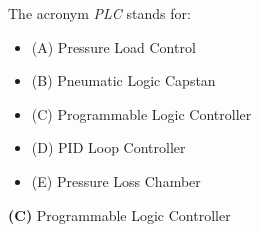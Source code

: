 

The acronym {\it PLC} stands for:

\begin{itemize}
\item{(A)} Pressure Load Control
\vskip 5pt 
\item{(B)} Pneumatic Logic Capstan
\vskip 5pt 
\item{(C)} Programmable Logic Controller
\vskip 5pt 
\item{(D)} PID Loop Controller
\vskip 5pt 
\item{(E)} Pressure Loss Chamber
\end{itemize}







{\bf (C)} Programmable Logic Controller
 










